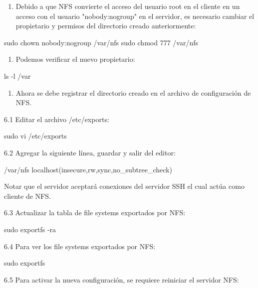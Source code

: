 \begin{enumerate}
\item Debido a que NFS convierte el acceso del usuario root en el cliente en un acceso con el usuario "nobody:nogroup" en el servidor, es necesario cambiar el propietario y permisos del directorio creado anteriormente:
\end{enumerate}

\begin{SourceCode}
sudo chown nobody:nogroup /var/nfs
sudo chmod 777 /var/nfs
\end{SourceCode}

\begin{enumerate}
\item Podemos verificar el nuevo propietario:
\end{enumerate}

\begin{SourceCode}
ls -l /var
\end{SourceCode}

\begin{enumerate}
\item Ahora se debe registrar el directorio creado en el archivo de configuración de NFS.
\end{enumerate}

6.1 Editar el archivo /etc/exports:

\begin{SourceCode}
sudo vi /etc/exports
\end{SourceCode}

6.2 Agregar la siguiente línea, guardar y salir del editor:

\begin{SourceCode}
/var/nfs localhost(insecure,rw,sync,no_subtree_check)
\end{SourceCode}

Notar que el servidor aceptará conexiones del servidor SSH el cual actúa como cliente de NFS.

6.3 Actualizar la tabla de file systems exportados por NFS:

\begin{SourceCode}
sudo exportfs -ra
\end{SourceCode}

6.4 Para ver los file systems exportados por NFS:

\begin{SourceCode}
sudo exportfs
\end{SourceCode}

6.5 Para activar la nueva configuración, se requiere reiniciar el servidor NFS:

